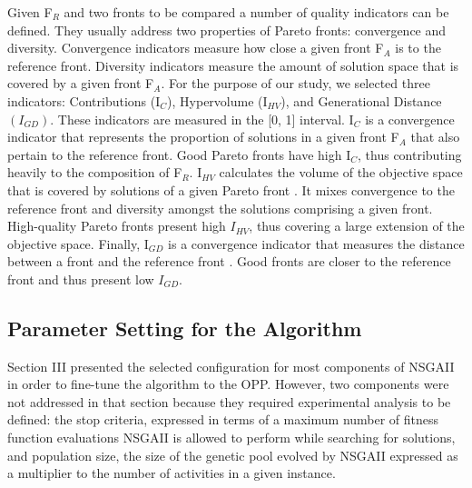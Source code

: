 \documentclass[conference]{IEEEtran}
\begin{document}
Given F$_{R}$ and two fronts to be compared a number of quality indicators can be defined. They usually address two properties of Pareto fronts: convergence and diversity. Convergence indicators measure how close a given front F$_{A}$ is to the reference front. Diversity indicators measure the amount of solution space that is covered by a given front F$_{A}$. For the purpose of our study, we selected three indicators: Contributions (I$_{C}$), Hypervolume (I$_{HV}$), and Generational Distance $(I_{GD})$. These indicators are measured in the [0, 1] interval. I$_{C}$ is a convergence indicator that represents the proportion of solutions in a given front F$_{A}$ that also pertain to the reference front. Good Pareto fronts have high I$_{C}$, thus contributing heavily to the composition of F$_{R}$. I$_{HV}$ calculates the volume of the objective space that is covered by solutions of a given Pareto front \cite{Durillo:2009}. It mixes convergence to the reference front and diversity amongst the solutions comprising a given front. High-quality Pareto fronts present high $I_{HV}$, thus covering a large extension of the objective space. Finally, I$_{GD}$ is a convergence indicator that measures the distance between a front and the reference front \cite{vanveldhuizen:1998}. Good fronts are closer to the reference front and thus present low $I_{GD}$.

\subsection{Parameter Setting for the Algorithm}
Section III presented the selected configuration for most components of NSGAII in order to fine-tune the algorithm to the OPP. However, two components were not addressed in that section because they required experimental analysis to be defined: the stop criteria, expressed in terms of a maximum number of fitness function evaluations NSGAII is allowed to perform while searching for solutions, and population size, the size of the genetic pool evolved by NSGAII expressed as a multiplier to the number of activities in a given instance.
\end{document}
